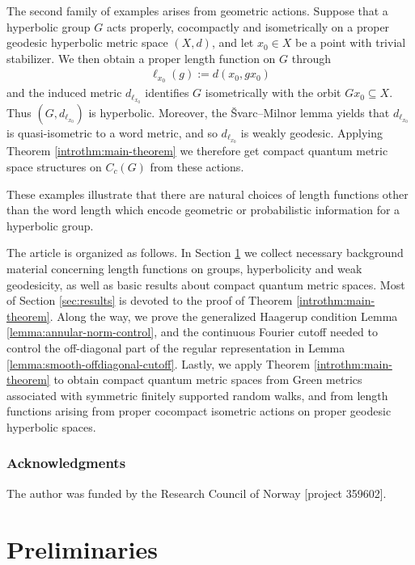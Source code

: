 \documentclass[12pt,a4paper,oneside,final,reqno]{amsart}
\theoremstyle{plain}
\theoremstyle{definition}
\begin{document}
The second family of examples arises from geometric actions. Suppose that a hyperbolic group $G$ acts properly, cocompactly and isometrically on a proper geodesic hyperbolic metric space $(X,d)$, and let $x_0 \in X$ be a point with trivial stabilizer. We then obtain a proper length function on $G$ through
\begin{align*}
    \ell_{x_0}(g) := d (x_0, gx_0)
\end{align*}
and the induced metric $d_{\ell_{x_0}}$ identifies $G$ isometrically with the orbit $Gx_0 \subseteq X$. Thus $(G,d_{\ell_{x_0}})$ is hyperbolic. Moreover, the \v{S}varc--Milnor lemma yields that $d_{\ell_{x_0}}$ is quasi-isometric to a word metric, and so $d_{\ell_{x_0}}$ is weakly geodesic. Applying Theorem \ref{introthm:main-theorem} we therefore get compact quantum metric space structures on $C_c(G)$ from these actions. 

These examples illustrate that there are natural choices of length functions other than the word length which encode geometric or probabilistic information for a hyperbolic group. 

The article is organized as follows. In Section \ref{sec:prelims} we collect necessary background material concerning length functions on groups, hyperbolicity and weak geodesicity, as well as basic results about compact quantum metric spaces. Most of Section \ref{sec:results} is devoted to the proof of Theorem \ref{introthm:main-theorem}. Along the way, we prove the generalized Haagerup condition Lemma \ref{lemma:annular-norm-control}, and the continuous Fourier cutoff needed to control the off-diagonal part of the regular representation in Lemma \ref{lemma:smooth-offdiagonal-cutoff}. Lastly, we apply Theorem \ref{introthm:main-theorem} to obtain compact quantum metric spaces from Green metrics associated with symmetric finitely supported random walks, and from length functions arising from proper cocompact isometric actions on proper geodesic hyperbolic spaces. 

\subsubsection*{Acknowledgments} The author was 
funded by the Research Council of Norway [project 359602].


\section{Preliminaries}\label{sec:prelims}
\end{document}
